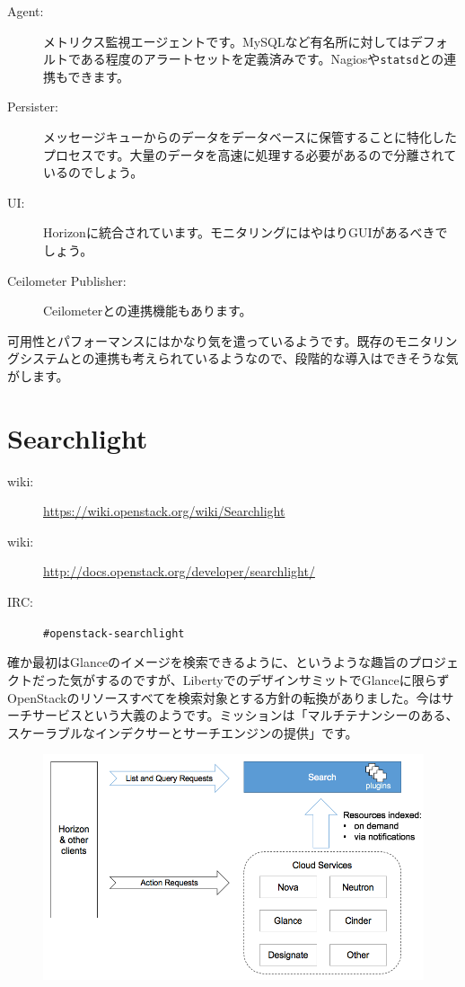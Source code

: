 \begin{description}
	\item[Agent:] メトリクス監視エージェントです。MySQLなど有名所に対してはデフォルトである程度のアラートセットを定義済みです。Nagiosや\verb|statsd|との連携もできます。
	\item[Persister:] メッセージキューからのデータをデータベースに保管することに特化したプロセスです。大量のデータを高速に処理する必要があるので分離されているのでしょう。
	\item[UI:] Horizonに統合されています。モニタリングにはやはりGUIがあるべきでしょう。
	\item[Ceilometer Publisher:] Ceilometerとの連携機能もあります。
\end{description}

可用性とパフォーマンスにはかなり気を遣っているようです。既存のモニタリングシステムとの連携も考えられているようなので、段階的な導入はできそうな気がします。

\section{Searchlight}

\begin{description}
	\item[wiki:] \url{https://wiki.openstack.org/wiki/Searchlight}
	\item[wiki:] \url{http://docs.openstack.org/developer/searchlight/}
	\item[IRC:] \verb|#openstack-searchlight|
\end{description}

確か最初はGlanceのイメージを検索できるように、というような趣旨のプロジェクトだった気がするのですが、LibertyでのデザインサミットでGlanceに限らずOpenStackのリソースすべてを検索対象とする方針の転換がありました。今はサーチサービスという大義のようです。ミッションは「マルチテナンシーのある、スケーラブルなインデクサーとサーチエンジンの提供」です。

\begin{figure}[htb]
	\begin{center}
		\includegraphics[width=\textwidth]{img/Searchlight-Concept-1.png}
	\end{center}
\end{figure}


